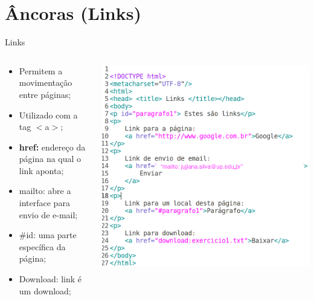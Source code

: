 \documentclass{beamer}
\begin{document}
\section{Âncoras (Links)}
\begin{frame}{Links}
  
  \begin{columns}
    \begin{column}{0.45 \textwidth}
  
      \begin{itemize}
      \item Permitem a movimentação entre páginas;
       \item Utilizado com a tag $<$a$>$;
       \item \textbf{href:} endereço da página na qual o link 
aponta; 
       \item mailto: abre a interface para envio de e-mail;
       \item \#id: uma parte específica da página;
       \item Download: link é um download;
     \end{itemize}
    \end{column}
    \begin{column}{0.5\textwidth}
     \includegraphics[height=0.6\paperheight]{fig/aula2/html6.png}
    \end{column}
  \end{columns}
\end{frame}
\end{document}
